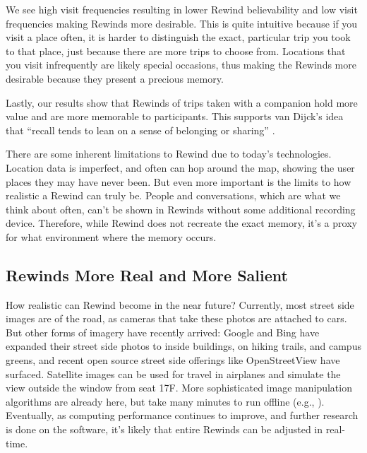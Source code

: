 \documentclass{sigchi}
\begin{document}
We see high visit frequencies resulting in lower Rewind believability and low visit frequencies making Rewinds more desirable. This is quite intuitive because if you visit a place often, it is harder to distinguish the exact, particular trip you took to that place, just because there are more trips to choose from. Locations that you visit infrequently are likely special occasions, thus making the Rewinds more desirable because they present a precious memory.

Lastly, our results show that Rewinds of trips taken with a companion hold more value and are more memorable to participants. This supports van Dijck's idea that ``recall tends to lean on a sense of belonging or sharing'' \cite{van2007mediated}.

		

There are some inherent limitations to Rewind due to today's technologies. Location data is imperfect, and often can hop around the map, showing the user places they may have never been. But even more important is the limits to how realistic a Rewind can truly be. People and conversations, which are what we think about often, can't be shown in Rewinds without some additional recording device. Therefore, while Rewind does not recreate the exact memory, it's a proxy for what environment where the memory occurs.

\subsection{Rewinds More Real and More Salient}

How realistic can Rewind become in the near future? Currently, most street side images are of the road, as cameras that take these photos are attached to cars. But other forms of imagery have recently arrived: Google and Bing have expanded their street side photos to inside buildings, on hiking trails, and campus greens, and recent open source street side offerings like OpenStreetView have surfaced. Satellite images can be used for travel in airplanes and simulate the view outside the window from seat 17F. More sophisticated image manipulation algorithms are already here, but take many minutes to run offline (e.g., \cite{laffont2014transient,shih2013data}). Eventually, as computing performance continues to improve, and further research is done on the software, it's likely that entire Rewinds can be adjusted in real-time.
\end{document}
